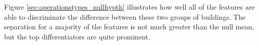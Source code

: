 Figure \ref{sec:operationstypes_nullhypth} illustrates how well all of the features are able to discriminate the difference between these two groups of buildings. The separation for a majority of the features is not much greater than the null mean, but the top differentiators are quite prominent.